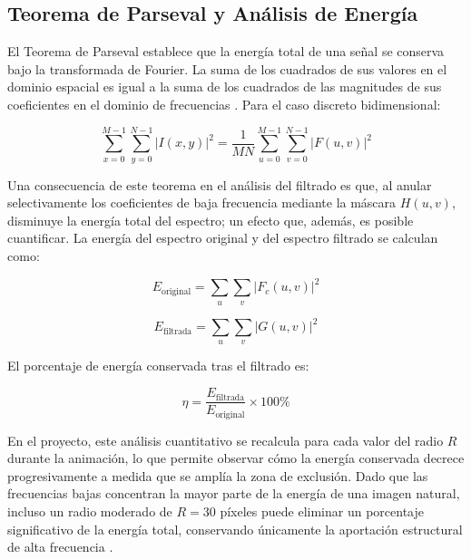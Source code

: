 \documentclass[conference]{IEEEtran}
\begin{document}
\subsection{Teorema de Parseval y Análisis de Energía}

El Teorema de Parseval establece que la energía total de una señal se conserva bajo la transformada de Fourier. La suma de los cuadrados de sus valores en el dominio espacial es igual a la suma de los cuadrados de las magnitudes de sus
coeficientes en el dominio de frecuencias \cite{ye2026, oppenheim2010}. Para el caso discreto bidimensional:

\begin{equation}
    \sum_{x=0}^{M-1}\sum_{y=0}^{N-1} |I(x,y)|^2
    = \frac{1}{MN}\sum_{u=0}^{M-1}\sum_{v=0}^{N-1} |F(u,v)|^2
    \label{eq:parseval}
\end{equation}

Una consecuencia de este teorema en el análisis del filtrado es que, al anular selectivamente los coeficientes de baja frecuencia mediante la máscara $H(u,v)$, disminuye la energía total del espectro; un efecto que, además, es posible cuantificar. La energía del espectro original y del espectro filtrado se
calculan como:

\begin{equation}
    E_{\text{original}} = \sum_{u}\sum_{v} |F_c(u,v)|^2
    \label{eq:energia_orig}
\end{equation}

\begin{equation}
    E_{\text{filtrada}} = \sum_{u}\sum_{v} |G(u,v)|^2
    \label{eq:energia_filt}
\end{equation}

El porcentaje de energía conservada tras el filtrado es:

\begin{equation}
    \eta = \frac{E_{\text{filtrada}}}{E_{\text{original}}} \times 100\%
    \label{eq:energia_conservada}
\end{equation}

En el proyecto, este análisis cuantitativo se recalcula para cada valor del
radio $R$ durante la animación, lo que permite observar cómo la energía
conservada decrece progresivamente a medida que se amplía la zona de exclusión.
Dado que las frecuencias bajas concentran la mayor parte de la energía de una
imagen natural, incluso un radio moderado de $R = 30$ píxeles puede eliminar un
porcentaje significativo de la energía total, conservando únicamente la
aportación estructural de alta frecuencia \cite{gonzalez2018}.
\end{document}
